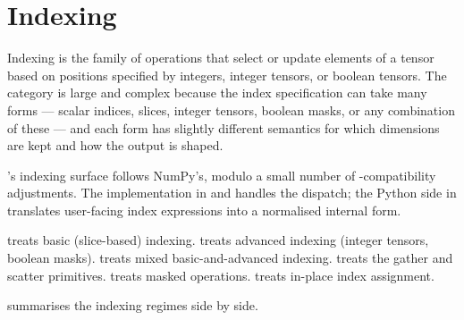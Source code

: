 \chapter{Indexing}
\label{ch:indexing}

Indexing is the family of operations that select or update elements
of a tensor based on positions specified by integers, integer
tensors, or boolean tensors. The category is large and complex
because the index specification can take many forms --- scalar
indices, slices, integer tensors, boolean masks, or any combination
of these --- and each form has slightly different semantics for
which dimensions are kept and how the output is shaped.

\Lucid's indexing surface follows NumPy's, modulo a small number of
-compatibility adjustments. The implementation in
 and
 handles the dispatch; the Python side in
 translates user-facing index
expressions into a normalised internal form.

 treats basic (slice-based) indexing.
 treats advanced indexing (integer
tensors, boolean masks).  treats mixed
basic-and-advanced indexing. 
treats the gather and scatter primitives.
 treats masked operations.
 treats in-place index assignment.

 summarises the indexing
regimes side by side.

